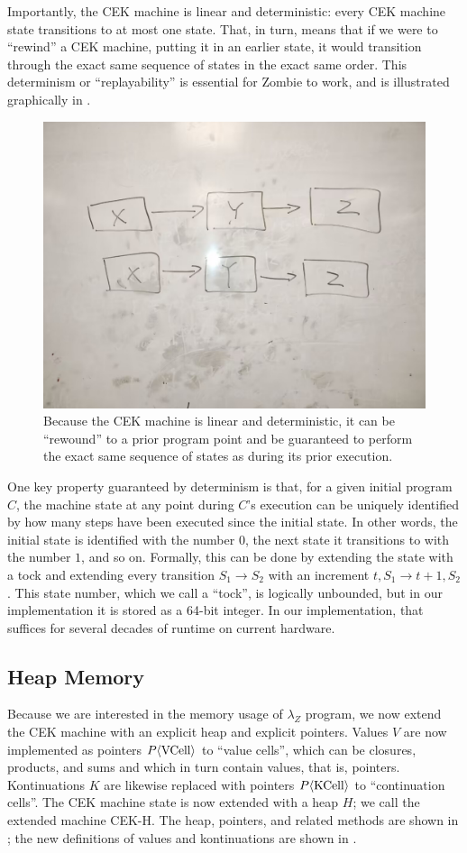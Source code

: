 Importantly, the CEK machine is linear and deterministic:
  every CEK machine state transitions to at most one state.
That, in turn, means that if we were to ``rewind'' a CEK machine,
  putting it in an earlier state,
  it would transition through the exact same sequence of states
  in the exact same order.
This determinism or ``replayability''
  is essential for Zombie to work,
  and is illustrated graphically in .

\begin{figure}
\includegraphics[width=0.5\columnwidth]{img0}
\caption{
  Because the CEK machine is linear and deterministic,
    it can be ``rewound'' to a prior program point
    and be guaranteed to perform the exact same sequence of states
    as during its prior execution.
  }
\label{fig:replayability}
\end{figure}

One key property guaranteed by determinism is that, for a given
initial program $C$, the machine state at any point during $C$'s
execution can be uniquely identified by how many steps have been
executed since the initial state. In other words, the initial state is
identified with the number $0$, the next state it transitions to with
the number $1$, and so on. Formally, this can be done by extending the
state with a tock and extending every transition $S_1 \to S_2$ with an
increment $t, S_1 \to t + 1, S_2$. This state number, which we call a
``tock'', is logically unbounded, but in our implementation it is
stored as a 64-bit integer. In our implementation, that suffices for
several decades of runtime on current hardware.

\subsection{Heap Memory}

Because we are interested in
  the memory usage of $\lambda_Z$ program,
  we now extend the CEK machine with an explicit heap
  and explicit pointers.
Values $V$ are now implemented as pointers
  $P\langle \text{\textnormal{VCell}} \rangle$ to ``value cells'',
  which can be closures, products, and sums
  and which in turn contain values, that is, pointers.
Kontinuations $K$ are likewise replaced
  with pointers $P\langle \text{\textnormal{KCell}} \rangle$
  to ``continuation cells''.
The CEK machine state is now extended
  with a heap $H$;
  we call the extended machine CEK-H.
The heap, pointers, and related methods
  are shown in ;
  the new definitions of values and kontinuations
  are shown in .

